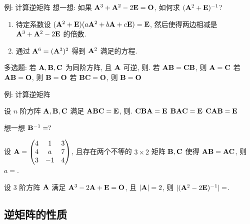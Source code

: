 \begin{frame}{例: 计算逆矩阵}
	\onslide<+->
	想一想: 如果 ${\mathbf{A}}^3+{\mathbf{A}}^2-2{\mathbf{E}}={\mathbf{O}}$, 如何求 $({\mathbf{A}}^2+{\mathbf{E}})^{-1}$?
	\onslide<+->
	\begin{enumerate}
		\item 待定系数设 $({\mathbf{A}}^2+{\mathbf{E}})(a{\mathbf{A}}^2+b{\mathbf{A}}+c{\mathbf{E}})={\mathbf{E}}$, 然后使得两边相减是 ${\mathbf{A}}^3+{\mathbf{A}}^2-2{\mathbf{E}}$ 的倍数.
		\item 通过 ${\mathbf{A}}^6=({\mathbf{A}}^3)^2$ 得到 ${\mathbf{A}}^2$ 满足的方程.
	\end{enumerate}
	\onslide<+->
	\begin{example}
		多选题: 若 ${\mathbf{A}},{\mathbf{B}},{\mathbf{C}}$ 为同阶方阵, 且 ${\mathbf{A}}$ 可逆, 则.
		{若 ${\mathbf{A}}{\mathbf{B}}={\mathbf{C}}{\mathbf{B}}$, 则 ${\mathbf{A}}={\mathbf{C}}$}%
		{若 ${\mathbf{A}}{\mathbf{B}}={\mathbf{O}}$, 则 ${\mathbf{B}}={\mathbf{O}}$}%
		{若 ${\mathbf{B}}{\mathbf{C}}={\mathbf{O}}$, 则 ${\mathbf{B}}={\mathbf{O}}$}
	\end{example}
\end{frame}


\begin{frame}{例: 计算逆矩阵}
	\onslide<+->
	\begin{example}
		设 $n$ 阶方阵 ${\mathbf{A}},{\mathbf{B}},{\mathbf{C}}$ 满足 ${\mathbf{A}}{\mathbf{B}}{\mathbf{C}}={\mathbf{E}}$, 则\fillbrace{\visible<+->{\alert{D}}}.
		\xx{$\bfA\bfC\bfB=\bfE$}%
		{${\mathbf{C}}{\mathbf{B}}{\mathbf{A}}={\mathbf{E}}$}%
		{${\mathbf{B}}{\mathbf{A}}{\mathbf{C}}={\mathbf{E}}$}%
		{${\mathbf{C}}{\mathbf{A}}{\mathbf{B}}={\mathbf{E}}$}
	\end{example}
	\onslide<+->
	想一想 ${\mathbf{B}}^{-1}=?$
	\onslide<+->
	\begin{exercise}
		设 ${\mathbf{A}}=\begin{pmatrix}
			4&1&3\\4&a&7\\3&-1&4
		\end{pmatrix}$, 且存在两个不等的 $3\times2$ 矩阵 ${\mathbf{B}},{\mathbf{C}}$ 使得 ${\mathbf{A}}{\mathbf{B}}={\mathbf{A}}{\mathbf{C}}$, 则 $a=$\fillblank{\visible<+->{\alert{$-3$}}}.
	\end{exercise}
	\onslide<+->
	\begin{exercise}
		设 $3$ 阶方阵 ${\mathbf{A}}$ 满足 ${\mathbf{A}}^3-2{\mathbf{A}}+{\mathbf{E}}={\mathbf{O}}$, 且 $|{\mathbf{A}}|=2$, 则 $|({\mathbf{A}}^2-2{\mathbf{E}})^{-1}|=$\fillblank{\visible<+->{\alert{$-2$}}}.
	\end{exercise}
\end{frame}


\subsection{逆矩阵的性质}

